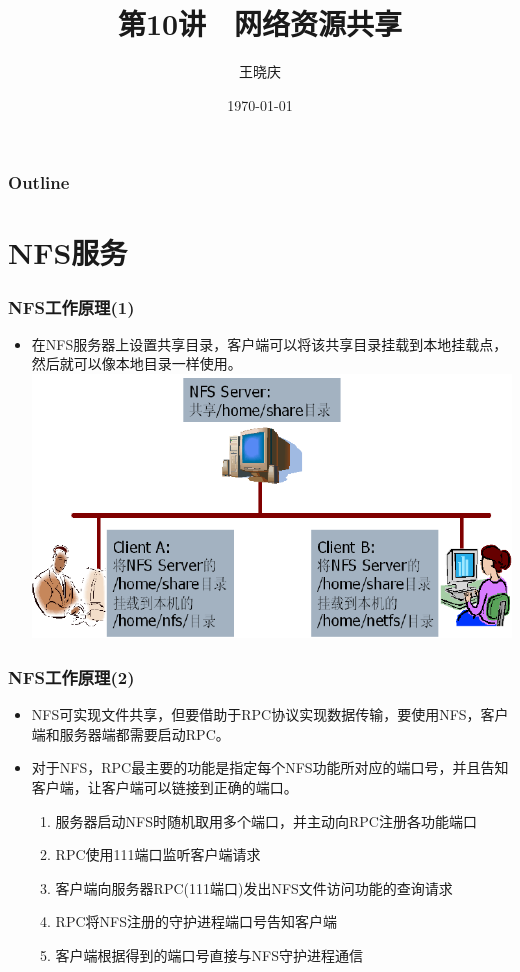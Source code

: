 \documentclass[xcolor=svgnames,presentation]{beamer}
\title{第10讲　网络资源共享}
\author{王晓庆}
\date{\today}
\institute{wangxiaoqing@outlook.com}
\begin{document}
\maketitle

\begin{frame}
\frametitle{Outline}
\setcounter{tocdepth}{1}
\tableofcontents
\end{frame}
\section{NFS服务}
\label{sec-1}
\begin{frame}
\frametitle{NFS工作原理(1)}
\label{sec-1-1}
\begin{itemize}

\item 在NFS服务器上设置共享目录，客户端可以将该共享目录挂载到本地挂载点，然后就可以像本地目录一样使用。\\
\label{sec-1-1-1}%
\includegraphics[width=.9\linewidth]{img/nfs.png}
\end{itemize} %
\end{frame}
\begin{frame}
\frametitle{NFS工作原理(2)}
\label{sec-1-2}
\begin{itemize}

\item NFS可实现文件共享，但要借助于RPC协议实现数据传输，要使用NFS，客户端和服务器端都需要启动RPC。
\label{sec-1-2-1}%

\item 对于NFS，RPC最主要的功能是指定每个NFS功能所对应的端口号，并且告知客户端，让客户端可以链接到正确的端口。
\label{sec-1-2-2}%
\begin{enumerate}
\item 服务器启动NFS时随机取用多个端口，并主动向RPC注册各功能端口
\item RPC使用111端口监听客户端请求
\item 客户端向服务器RPC(111端口)发出NFS文件访问功能的查询请求
\item RPC将NFS注册的守护进程端口号告知客户端
\item 客户端根据得到的端口号直接与NFS守护进程通信
\end{enumerate}
\end{itemize} %
\end{frame}
\end{document}

